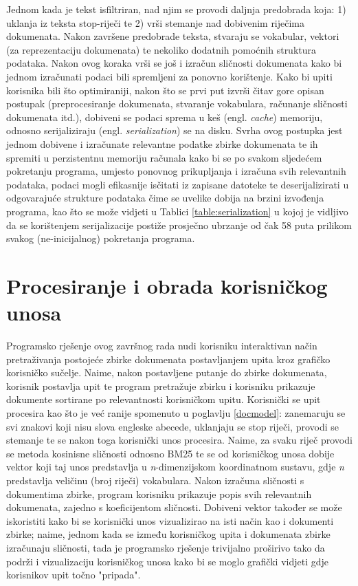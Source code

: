\documentclass[times, utf8, zavrsni]{fer}
\begin{document}
Jednom kada je tekst isfiltriran, nad njim se provodi daljnja predobrada koja: 1) uklanja iz teksta stop-riječi te 2) vrši stemanje nad dobivenim riječima dokumenata. Nakon završene predobrade teksta, stvaraju se vokabular, vektori (za reprezentaciju dokumenata) te nekoliko dodatnih pomoćnih struktura podataka. Nakon ovog koraka vrši se još i izračun sličnosti dokumenata kako bi jednom izračunati podaci bili spremljeni za ponovno korištenje. Kako bi upiti korisnika bili što optimiraniji, nakon što se prvi put izvrši čitav gore opisan postupak (preprocesiranje dokumenata, stvaranje vokabulara, računanje sličnosti dokumenata itd.), dobiveni se podaci sprema u keš (engl. \textit{cache}) memoriju, odnosno serijaliziraju (engl. \textit{serialization}) se na disku. Svrha ovog postupka jest jednom dobivene i izračunate relevantne podatke zbirke dokumenata te ih spremiti u perzistentnu memoriju računala kako bi se po svakom sljedećem pokretanju programa, umjesto ponovnog prikupljanja i izračuna svih relevantnih podataka, podaci mogli efikasnije isčitati iz zapisane datoteke te deserijalizirati u odgovarajuće strukture podataka čime se uvelike dobija na brzini izvođenja programa, kao što se može vidjeti u Tablici
\ref{table:serialization} u kojoj je vidljivo da se korištenjem serijalizacije postiže prosječno ubrzanje od čak 58 puta prilikom svakog (ne-inicijalnog) pokretanja programa.

\section{Procesiranje i obrada korisničkog unosa}
Programsko rješenje ovog završnog rada nudi korisniku interaktivan način pretraživanja postojeće zbirke dokumenata postavljanjem upita kroz grafičko korisničko sučelje. Naime, nakon postavljene putanje do zbirke dokumenata, korisnik postavlja upit te program pretražuje zbirku i korisniku prikazuje dokumente sortirane po relevantnosti korisničkom upitu. Korisnički se upit procesira kao što je već ranije spomenuto u poglavlju \ref{docmodel}: zanemaruju se svi znakovi koji nisu slova engleske abecede, uklanjaju se stop riječi, provodi se stemanje te se nakon toga korisnički unos procesira. Naime, za svaku riječ provodi se metoda kosinisne sličnosti odnosno BM25 te se od korisničkog unosa dobije vektor koji taj unos predstavlja u \textit{n}-dimenzijskom koordinatnom sustavu, gdje \textit{n} predstavlja veličinu (broj riječi) vokabulara. Nakon izračuna sličnosti s dokumentima zbirke, program korisniku prikazuje popis svih relevantnih dokumenata, zajedno s koeficijentom sličnosti. Dobiveni vektor također se može iskoristiti kako bi se korisnički unos vizualizirao na isti način kao i dokumenti zbirke; naime, jednom kada se između korisničkog upita i dokumenata zbirke izračunaju sličnosti, tada je programsko rješenje trivijalno proširivo tako da podrži i vizualizaciju korisničkog unosa kako bi se moglo grafički vidjeti gdje korisnikov upit točno "pripada".
\end{document}
